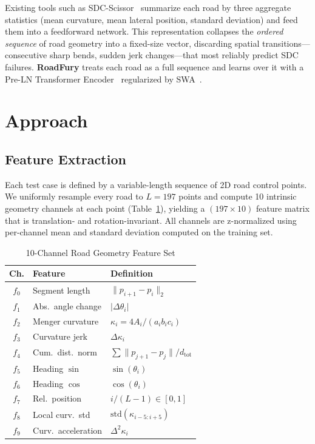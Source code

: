 \documentclass[conference]{IEEEtran}
\begin{document}
Existing tools such as SDC-Scissor~\cite{b1,b2} summarize each road by three aggregate statistics (mean curvature, mean lateral position, standard deviation) and feed them into a feedforward network.
This representation collapses the \emph{ordered sequence} of road geometry into a fixed-size vector, discarding spatial transitions---consecutive sharp bends, sudden jerk changes---that most reliably predict SDC failures.
\textbf{RoadFury} treats each road as a full sequence and learns over it with a Pre-LN Transformer Encoder~\cite{b11} regularized by SWA~\cite{b6}.

\section{Approach}

\subsection{Feature Extraction}

Each test case is defined by a variable-length sequence of 2D road control points.
We uniformly resample every road to $L{=}197$ points and compute 10 intrinsic geometry channels at each point (Table~\ref{tab:features}), yielding a $(197{\times}10)$ feature matrix that is translation- and rotation-invariant.
All channels are z-normalized using per-channel mean and standard deviation computed on the training set.

\begin{table}[t]
\caption{10-Channel Road Geometry Feature Set}
\vspace{-4pt}
\begin{center}
\setlength{\tabcolsep}{3pt}
{\small\begin{tabular}{cll}
\toprule
\textbf{Ch.} & \textbf{Feature} & \textbf{Definition} \\
\midrule
$f_0$ & Segment length      & $\|p_{i+1}-p_i\|_2$ \\
$f_1$ & Abs.\ angle change  & $|\Delta\theta_i|$ \\
$f_2$ & Menger curvature    & $\kappa_i=4A_i/(a_i b_i c_i)$ \\
$f_3$ & Curvature jerk      & $\Delta\kappa_i$ \\
$f_4$ & Cum.\ dist.\ norm   & $\sum\|p_{j+1}{-}p_j\|/d_\text{tot}$ \\
$f_5$ & Heading $\sin$      & $\sin(\theta_i)$ \\
$f_6$ & Heading $\cos$      & $\cos(\theta_i)$ \\
$f_7$ & Rel.\ position      & $i/(L{-}1)\in[0,1]$ \\
$f_8$ & Local curv.\ std    & $\text{std}(\kappa_{i-5{:}i+5})$ \\
$f_9$ & Curv.\ acceleration & $\Delta^2\kappa_i$ \\
\bottomrule
\end{tabular}}
\label{tab:features}
\end{center}
\vspace{-6pt}
\end{table}
\end{document}
